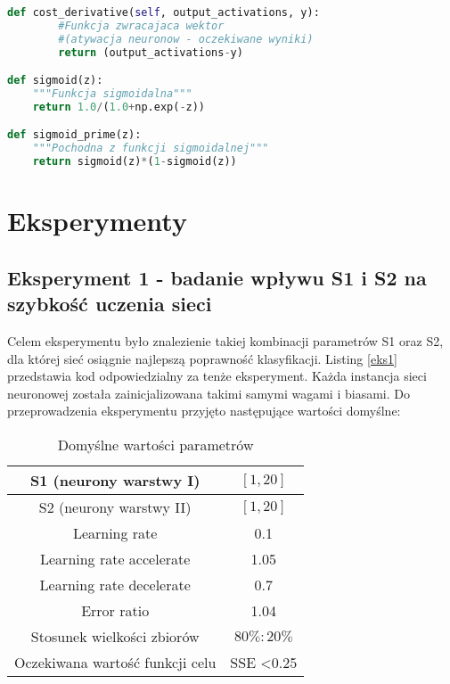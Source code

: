 \documentclass[12pt,twoside]{article}
\begin{document}
\begin{lstlisting}[language=Python,caption=Algorytm uczenia sieci,label={Kod2}]
    def cost_derivative(self, output_activations, y):
        #Funkcja zwracajaca wektor 
        #(atywacja neuronow - oczekiwane wyniki)
        return (output_activations-y)

def sigmoid(z):
    """Funkcja sigmoidalna"""
    return 1.0/(1.0+np.exp(-z))

def sigmoid_prime(z):
    """Pochodna z funkcji sigmoidalnej"""
    return sigmoid(z)*(1-sigmoid(z))

\end{lstlisting}
\clearpage

\section{Eksperymenty}


\subsection{Eksperyment 1 - badanie wpływu S1 i S2 na szybkość uczenia sieci}

Celem eksperymentu było znalezienie takiej kombinacji parametrów S1 oraz S2, dla której sieć osiągnie najlepszą poprawność klasyfikacji. Listing \ref{eks1} przedstawia kod odpowiedzialny za tenże eksperyment. Każda instancja sieci neuronowej została zainicjalizowana takimi samymi wagami i biasami. Do przeprowadzenia eksperymentu przyjęto następujące wartości domyślne:

\begin{table}[H]
\begin{center}
\begin{tabular}{|c|c|}
\hline
S1 (neurony warstwy I) & $[1, 20]$\\
\hline
S2 (neurony warstwy II) & $[1, 20]$\\
\hline
Learning rate & 0.1\\
\hline
Learning rate accelerate & 1.05\\
\hline
Learning rate decelerate & 0.7\\
\hline
Error ratio & 1.04\\
\hline
Stosunek wielkości zbiorów & $80\% : 20\%$\\
\hline
Oczekiwana wartość funkcji celu & SSE <0.25\\
\hline
\end{tabular}
\caption{Domyślne wartości parametrów}
\label{tab2}
\end{center}
\end{table}
\end{document}
